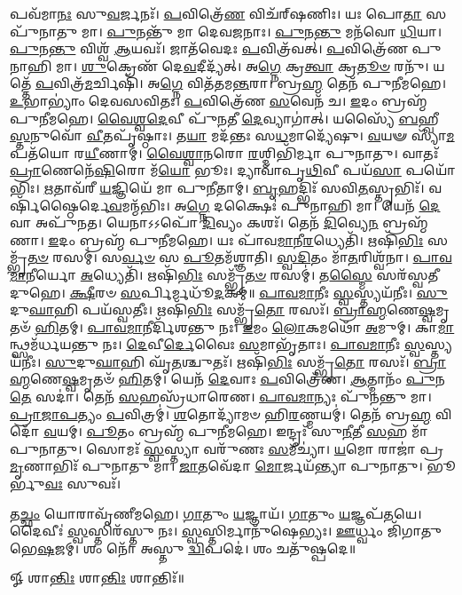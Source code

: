 𑌪𑌵᳴𑌮𑌾\-\ul{𑌨𑌃} 𑌸𑍁\-\ul{𑌵}\-𑌰𑍍𑌜𑌨𑌃᳴। \ul{𑌪}\-𑌵𑌿𑌤𑍍𑌰𑍇᳴\-\ul{𑌣} 𑌵𑌿𑌚᳴𑌰𑍍‌𑌷𑌣𑌿𑌃। 𑌯𑌃 𑌪𑍋\-\ul{𑌤𑌾} 𑌸 𑌪𑍁᳴𑌨𑌾𑌤𑍁 𑌮𑌾। \ul{𑌪𑍁}\-𑌨𑌨𑍍𑌤𑍁᳴ 𑌮𑌾 𑌦𑍇𑌵\-\ul{𑌜}\-𑌨𑌾𑌃।
\-\ul{𑌪𑍁}\-𑌨\-\ul{𑌨𑍍𑌤𑍁} 𑌮𑌨᳴𑌵𑍋 \ul{𑌧𑌿}\-𑌯𑌾। \ul{𑌪𑍁}\-𑌨\-\ul{𑌨𑍍𑌤𑍁} 𑌵𑌿𑌶𑍍𑌵᳴ \ul{𑌆}\-𑌯𑌵𑌃᳴। 𑌜𑌾𑌤᳴𑌵𑍇𑌦𑌃 \ul{𑌪}\-𑌵𑌿𑌤𑍍𑌰᳴𑌵𑌤𑍍। \ul{𑌪}\-𑌵𑌿𑌤𑍍𑌰𑍇᳴𑌣 𑌪𑍁𑌨𑌾𑌹𑌿 𑌮𑌾।
\-\ul{𑌶𑍁}\-𑌕𑍍𑌰𑍇𑌣᳴ 𑌦𑍇\-\ul{𑌵}\-𑌦𑍀𑌦𑍍𑌯᳴𑌤𑍍। 𑌅\-\ul{𑌗𑍍𑌨𑍇} 𑌕𑍍𑌰\-\ul{𑌤𑍍𑌵𑌾} 𑌕𑍍𑌰\-\ul{𑌤𑍂}\-\-\ul{𑍞} 𑌰𑌨𑍁᳴। 𑌯𑌤𑍍𑌤𑍇᳴ \ul{𑌪}\-𑌵𑌿𑌤𑍍𑌰᳴\-\ul{𑌮}\-𑌰𑍍𑌚𑌿𑌷𑌿᳴। 𑌅\-\ul{𑌗𑍍𑌨𑍇} 𑌵𑌿𑌤᳴𑌤𑌮\-\ul{𑌨𑍍𑌤}\-𑌰𑌾।
𑌬𑍍𑌰\-\ul{𑌹𑍍𑌮} 𑌤𑍇𑌨᳴ 𑌪𑍁𑌨𑍀𑌮𑌹𑍇। \ul{𑌉}\-𑌭𑌾𑌭𑍍𑌯𑌾𑌂॑ 𑌦𑍇𑌵𑌸𑌵𑌿𑌤𑌃। \ul{𑌪}\-𑌵𑌿𑌤𑍍𑌰𑍇᳴𑌣 \ul{𑌸}\-𑌵𑍇𑌨᳴ 𑌚। \ul{𑌇}\-𑌦𑌂 𑌬𑍍𑌰𑌹𑍍𑌮᳴ 𑌪𑍁𑌨𑍀𑌮𑌹𑍇।
\-\ul{𑌵𑍈}\-\-\ul{𑌶𑍍𑌵}\-\-\ul{𑌦𑍇}\-𑌵𑍀 𑌪𑍁᳴\-\ul{𑌨}\-𑌤𑍀 \ul{𑌦𑍇}\-𑌵𑍍𑌯𑌾𑌗𑌾॑𑌤𑍍। 𑌯𑌸𑍍𑌯𑍈᳴ \ul{𑌬}\-𑌹𑍍𑌵𑍀\-\ul{𑌸𑍍𑌤}\-𑌨𑍁𑌵𑍋᳴ \ul{𑌵𑍀}\-𑌤𑌪𑍃᳴𑌷𑍍𑌠𑌾𑌃।
𑌤\-\ul{𑌯𑌾} 𑌮𑌦᳴𑌨𑍍𑌤𑌃 𑌸\-\ul{𑌧}\-𑌮𑌾𑌦𑍍𑌯𑍇᳴𑌷𑍁। \ul{𑌵}\-𑌯𑍟 𑌸𑍍𑌯𑌾᳴\-\ul{𑌮} 𑌪𑌤᳴𑌯𑍋 𑌰\-\ul{𑌯𑍀}\-𑌣𑌾𑌮𑍍।
\-\ul{𑌵𑍈}\-\-\ul{𑌶𑍍𑌵𑌾}\-\-\ul{𑌨}\-𑌰𑍋 \ul{𑌰}\-𑌶𑍍𑌮𑌿𑌭𑌿᳴𑌰𑍍𑌮𑌾 𑌪𑍁𑌨𑌾𑌤𑍁। 𑌵𑌾𑌤𑌃᳴ \ul{𑌪𑍍𑌰𑌾}\-𑌣𑍇𑌨𑍇᳴\-\ul{𑌷𑌿}\-𑌰𑍋 𑌮᳴\-\ul{𑌯𑍋} 𑌭𑍂𑌃।
𑌦𑍍𑌯𑌾𑌵𑌾᳴𑌪𑍃\-\ul{𑌥𑌿}\-𑌵𑍀 𑌪𑌯᳴\-\ul{𑌸𑌾} 𑌪𑌯𑍋᳴𑌭𑌿𑌃। \ul{𑌋}\-𑌤𑌾𑌵᳴𑌰𑍀 \ul{𑌯}\-𑌜𑍍𑌞𑌿𑌯𑍇᳴ 𑌮𑌾 𑌪𑍁𑌨𑍀𑌤𑌾𑌮𑍍।
\-\ul{𑌬𑍃}\-𑌹𑌦𑍍𑌭𑌿𑌃᳴ 𑌸𑌵𑌿\-\ul{𑌤}\-𑌸𑍍𑌤𑍃𑌭𑌿𑌃᳴। 𑌵𑌰𑍍{}𑌷𑌿᳴𑌷𑍍𑌠𑍈𑌰𑍍𑌦𑍇\-\ul{𑌵}\-𑌮𑌨𑍍𑌮᳴𑌭𑌿𑌃।
𑌅\-\ul{𑌗𑍍𑌨𑍇} 𑌦𑌕𑍍𑌷𑍈𑌃॑ 𑌪𑍁𑌨𑌾𑌹𑌿 𑌮𑌾। 𑌯𑍇𑌨᳴ \ul{𑌦𑍇}\-𑌵𑌾 𑌅𑌪𑍁᳴𑌨𑌤।
𑌯𑍇𑌨𑌾𑌽𑌽𑌪𑍋᳴ \ul{𑌦𑌿}\-𑌵𑍍𑌯𑌂 𑌕𑌶𑌃᳴। 𑌤𑍇𑌨᳴ \ul{𑌦𑌿}\-𑌵𑍍𑌯𑍇\-\ul{𑌨} 𑌬𑍍𑌰𑌹𑍍𑌮᳴𑌣𑌾। \ul{𑌇}\-𑌦𑌂 𑌬𑍍𑌰𑌹𑍍𑌮᳴ 𑌪𑍁𑌨𑍀𑌮𑌹𑍇। 𑌯𑌃 𑌪𑌾᳴𑌵\-\ul{𑌮𑌾}\-𑌨𑍀\-\ul{𑌰}\-𑌧𑍍𑌯𑍇𑌤𑌿᳴।
𑌋𑌷𑌿᳴\-\ul{𑌭𑌿𑌃} 𑌸𑌮𑍍𑌭𑍃᳴\-\ul{𑌤}\-\-\ul{𑍞} 𑌰𑌸𑌮𑍍॑। 𑌸\-\ul{𑌰𑍍𑌵}\-\-\ul{𑍞} 𑌸 \ul{𑌪𑍂}\-𑌤𑌮᳴𑌶𑍍𑌞𑌾𑌤𑌿।
\-\ul{𑌸𑍍𑌵}\-\-\ul{𑌦𑌿}\-𑌤𑌂 𑌮𑌾᳴\-\ul{𑌤}\-𑌰𑌿𑌶𑍍𑌵᳴𑌨𑌾। \ul{𑌪𑌾}\-\-\ul{𑌵}\-\-\ul{𑌮𑌾}\-𑌨𑍀𑌰𑍍𑌯𑍋 \ul{𑌅}\-𑌧𑍍𑌯𑍇𑌤𑌿᳴।
𑌋𑌷𑌿᳴\-\ul{𑌭𑌿𑌃} 𑌸𑌮𑍍𑌭𑍃᳴\-\ul{𑌤}\-\-\ul{𑍞} 𑌰𑌸𑌮𑍍॑। 𑌤\-\ul{𑌸𑍍𑌮𑍈} 𑌸𑌰᳴𑌸𑍍𑌵𑌤𑍀 𑌦𑍁𑌹𑍇। \ul{𑌕𑍍𑌷𑍀}\-𑌰𑍞 \ul{𑌸}\-𑌰𑍍𑌪𑌿𑌰𑍍𑌮𑌧𑍂᳴\-\ul{𑌦}\-𑌕𑌮𑍍॥
\-\ul{𑌪𑌾}\-\-\ul{𑌵}\-\-\ul{𑌮𑌾}\-𑌨𑍀𑌃 \ul{𑌸𑍍𑌵}\-𑌸𑍍𑌤𑍍𑌯𑌯᳴𑌨𑍀𑌃। \ul{𑌸𑍁}\-𑌦𑍁\-\ul{𑌘𑌾}\-𑌹𑌿 𑌪𑌯᳴𑌸𑍍𑌵𑌤𑍀𑌃।
𑌋𑌷𑌿᳴\-\ul{𑌭𑌿𑌃} 𑌸𑌮𑍍𑌭𑍃᳴\-\ul{𑌤𑍋} 𑌰𑌸𑌃᳴। \ul{𑌬𑍍𑌰𑌾}\-\-\ul{𑌹𑍍𑌮}\-𑌣𑍇\-\ul{𑌷𑍍𑌵}\-𑌮𑍃𑌤𑍞᳴ \ul{𑌹𑌿}\-𑌤𑌮𑍍।
\-\ul{𑌪𑌾}\-\-\ul{𑌵}\-\-\ul{𑌮𑌾}\-𑌨𑍀𑌰𑍍𑌦𑌿᳴𑌶𑌨𑍍𑌤𑍁 𑌨𑌃। \ul{𑌇}\-𑌮𑌂 \ul{𑌲𑍋}\-𑌕𑌮𑌥𑍋᳴ \ul{𑌅}\-𑌮𑍁𑌮𑍍।
𑌕𑌾\-\ul{𑌮𑌾}\-𑌨𑍍𑌥𑍍𑌸𑌮᳴𑌰𑍍𑌧𑌯𑌨𑍍𑌤𑍁 𑌨𑌃। \ul{𑌦𑍇}\-𑌵𑍀\-\ul{𑌰𑍍𑌦𑍇}\-𑌵𑍈𑌃 \ul{𑌸}\-𑌮𑌾𑌭𑍃᳴𑌤𑌾𑌃।
\-\ul{𑌪𑌾}\-\-\ul{𑌵}\-\-\ul{𑌮𑌾}\-𑌨𑍀𑌃 \ul{𑌸𑍍𑌵}\-𑌸𑍍𑌤𑍍𑌯𑌯᳴𑌨𑍀𑌃। \ul{𑌸𑍁}\-𑌦𑍁\-\ul{𑌘𑌾}\-𑌹𑌿 𑌘𑍃᳴\-\ul{𑌤}\-𑌶𑍍𑌚𑍁𑌤𑌃᳴।
𑌋𑌷𑌿᳴\-\ul{𑌭𑌿𑌃} 𑌸𑌮𑍍𑌭𑍃᳴\-\ul{𑌤𑍋} 𑌰𑌸𑌃᳴। \ul{𑌬𑍍𑌰𑌾}\-\-\ul{𑌹𑍍𑌮}\-𑌣𑍇\-\ul{𑌷𑍍𑌵}\-𑌮𑍃𑌤𑍞᳴ \ul{𑌹𑌿}\-𑌤𑌮𑍍।
𑌯𑍇𑌨᳴ \ul{𑌦𑍇}\-𑌵𑌾𑌃 \ul{𑌪}\-𑌵𑌿𑌤𑍍𑌰𑍇᳴𑌣। \ul{𑌆}\-𑌤𑍍𑌮𑌾𑌨𑌂᳴ \ul{𑌪𑍁}\-𑌨\-\ul{𑌤𑍇} 𑌸𑌦𑌾॑।
𑌤𑍇𑌨᳴ \ul{𑌸}\-𑌹𑌸𑍍𑌰᳴𑌧𑌾𑌰𑍇𑌣। \ul{𑌪𑌾}\-\-\ul{𑌵}\-\-\ul{𑌮𑌾}\-𑌨𑍍𑌯𑌃 𑌪𑍁᳴𑌨𑌨𑍍𑌤𑍁 𑌮𑌾।
\-\ul{𑌪𑍍𑌰𑌾}\-\-\ul{𑌜𑌾}\-\-\ul{𑌪}\-𑌤𑍍𑌯𑌂 \ul{𑌪}\-𑌵𑌿𑌤𑍍𑌰𑌮𑍍॑। \ul{𑌶}\-𑌤𑍋𑌦𑍍𑌯𑌾᳴𑌮𑍞 𑌹𑌿\-\ul{𑌰}\-𑌣𑍍𑌮𑌯𑌮𑍍॑।
𑌤𑍇𑌨᳴ 𑌬𑍍𑌰\-\ul{𑌹𑍍𑌮} 𑌵𑌿𑌦𑍋᳴ \ul{𑌵}\-𑌯𑌮𑍍। \ul{𑌪𑍂}\-𑌤𑌂 𑌬𑍍𑌰𑌹𑍍𑌮᳴ 𑌪𑍁𑌨𑍀𑌮𑌹𑍇।
𑌇𑌨𑍍𑌦𑍍𑌰𑌃᳴ 𑌸𑍁\-\ul{𑌨𑍀}\-𑌤𑍀 \ul{𑌸}\-𑌹 𑌮𑌾᳴ 𑌪𑍁𑌨𑌾𑌤𑍁। 𑌸𑍋𑌮𑌃᳴ \ul{𑌸𑍍𑌵}\-𑌸𑍍𑌤𑍍𑌯𑌾 𑌵𑌰𑍁᳴𑌣𑌃 \ul{𑌸}\-𑌮𑍀𑌚𑍍𑌯𑌾॑।
\-\ul{𑌯}\-𑌮𑍋 𑌰𑌾𑌜𑌾॑ 𑌪𑍍𑌰\-\ul{𑌮𑍃}\-𑌣𑌾𑌭𑌿𑌃᳴ 𑌪𑍁𑌨𑌾𑌤𑍁 𑌮𑌾। \ul{𑌜𑌾}\-𑌤𑌵𑍇᳴𑌦𑌾 \ul{𑌮𑍋}\-𑌰𑍍𑌜𑌯᳴𑌨𑍍𑌤𑍍𑌯𑌾 𑌪𑍁𑌨𑌾𑌤𑍁। 𑌭𑍂𑌰𑍍𑌭𑍁\-\ul{𑌵𑌃} 𑌸𑍁𑌵𑌃᳴।

𑌤\-\ul{𑌚𑍍𑌛𑌂} 𑌯𑍋𑌰𑌾𑌵𑍃᳴𑌣𑍀𑌮𑌹𑍇। \ul{𑌗𑌾}\-𑌤𑍁𑌂 \ul{𑌯}\-𑌜𑍍𑌞𑌾𑌯᳴। \ul{𑌗𑌾}\-𑌤𑍁𑌂 \ul{𑌯}\-𑌜𑍍𑌞𑌪᳴𑌤𑌯𑍇। 𑌦𑍈𑌵𑍀𑌃॑ \ul{𑌸𑍍𑌵}\-𑌸𑍍𑌤𑌿𑌰᳴𑌸𑍍𑌤𑍁 𑌨𑌃।
\-\ul{𑌸𑍍𑌵}\-𑌸𑍍𑌤𑌿𑌰𑍍𑌮𑌾𑌨𑍁᳴𑌷𑍇𑌭𑍍𑌯𑌃। \ul{𑌊}\-𑌰𑍍𑌧𑍍𑌵𑌂 𑌜𑌿᳴𑌗𑌾𑌤𑍁 𑌭𑍇\-\ul{𑌷}\-𑌜𑌮𑍍। 𑌶𑌂 𑌨𑍋᳴ 𑌅𑌸𑍍𑌤𑍁 \ul{𑌦𑍍𑌵𑌿}\-𑌪𑌦𑍇॑। 𑌶𑌂 𑌚𑌤𑍁᳴𑌷𑍍𑌪𑌦𑍇॥

\centerline{𑍐 𑌶𑌾\-\ul{𑌨𑍍𑌤𑌿𑌃} 𑌶𑌾\-\ul{𑌨𑍍𑌤𑌿𑌃} 𑌶𑌾𑌨𑍍𑌤𑌿𑌃᳴॥}
